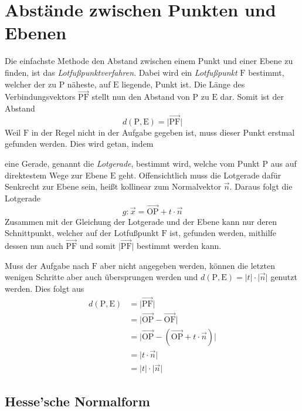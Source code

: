 \documentclass{article}
\begin{document}
   
\newcommand{\norm}[1]{\big| {#1} \big|}  
\newcommand{\vect}[1]{\overrightarrow{#1}} 
\newcommand{\vectp}[1]{\vect{\mathrm{#1}}}
  
\section{Abstände zwischen Punkten und Ebenen}
 
\begin{minipage}[t]{\dimexpr\textwidth-5cm}
 Die einfachste Methode den Abstand zwischen einem Punkt und einer Ebene zu finden, ist das \emph{Lotfußpunktverfahren}. Dabei wird ein \emph{Lotfußpunkt} $\mathrm{F}$ bestimmt, welcher der zu $\mathrm{P}$ näheste, auf $\mathrm{E}$ liegende, Punkt ist. Die Länge des Verbindungsvektors $\vectp{PF}$ stellt nun den Abstand von $\mathrm{P}$ zu $\mathrm{E}$ dar. Somit ist der Abstand
 \[
  d(\mathrm{P}, \mathrm{E}) = \norm{\vectp{PF}}
 \] 
 Weil $\mathrm{F}$ in der Regel nicht in der Aufgabe gegeben ist, muss dieser Punkt erstmal gefunden werden. Dies wird getan, indem \\[-0.7em]
\end{minipage} 
\hfill
\begin{minipage}[t]{5cm}
 \centering 
\end{minipage}
eine Gerade, genannt die \emph{Lotgerade}, bestimmt wird, welche vom Punkt $\mathrm{P}$ aus auf direktestem Wege zur Ebene $\mathrm{E}$ geht. Offensichtlich muss die Lotgerade dafür Senkrecht zur Ebene sein, heißt kollinear zum Normalvektor $\vect{n}$. Daraus folgt die Lotgerade
\[
 g: \vect{x} = \vectp{OP} + t \cdot \vect{n} 
\]
Zusammen mit der Gleichung der Lotgerade und der Ebene kann nur deren Schnittpunkt, welcher auf der Lotfußpunkt $\mathrm{F}$ ist, gefunden werden, mithilfe dessen nun auch $\vectp{PF}$ und somit $\norm{\vectp{PF}}$ bestimmt werden kann.
 
Muss der Aufgabe nach $\mathrm{F}$ aber nicht angegeben werden, können die letzten wenigen Schritte aber auch übersprungen werden und 
\(
 d(\mathrm{P}, \mathrm{E}) = \norm{t} \cdot \norm{\vect{n}}
\)
genutzt werden. Dies folgt aus 
\begin{align*}
 d(\mathrm{P}, \mathrm{E}) &= \norm{\vectp{PF}} \\
  &= \norm{\vectp{OP} - \vectp{OF}} \\ 
  &= \norm{\vectp{OP} - (\vectp{OP} + t \cdot \vect{n})} \\
  &= \norm{t \cdot \vect{n}} \\
  &= \norm{t} \cdot \norm{\vect{n}}
\end{align*}
 
\subsection{Hesse'sche Normalform} 
 
\end{document}
